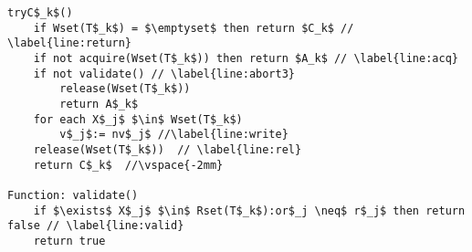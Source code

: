 \begin{algorithm*}[!t]
\begin{minipage}{0.49\textwidth}
\begin{lstlisting}[frame=none,firstnumber=last,mathescape=true]
tryC$_k$()
    if Wset(T$_k$) = $\emptyset$ then return $C_k$ // \label{line:return}
    if not acquire(Wset(T$_k$)) then return $A_k$ // \label{line:acq}
    if not validate() // \label{line:abort3}
	    release(Wset(T$_k$)) 
	    return A$_k$ 
    for each X$_j$ $\in$ Wset(T$_k$)
	    v$_j$:= nv$_j$ //\label{line:write}
    release(Wset(T$_k$))  // \label{line:rel}	
    return C$_k$  //\vspace{-2mm}

Function: validate()
    if $\exists$ X$_j$ $\in$ Rset(T$_k$):or$_j \neq$ r$_j$ then return false // \label{line:valid}
    return true

\end{lstlisting}
\end{minipage}
\vspace{-2mm}
\end{algorithm*}
%
% 		
% 		
% 		
% 		
% 	
